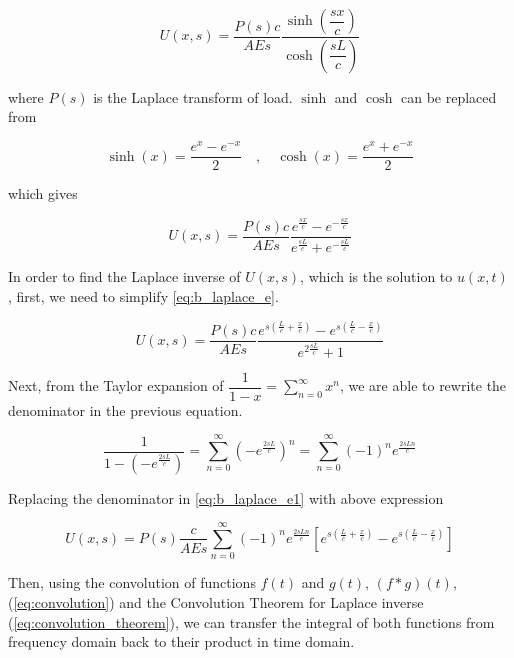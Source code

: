 \documentclass{article}
\begin{document}
\begin{equation}
    U(x, s) = \frac{P(s) c}{AE s} \frac{\sinh(\dfrac{sx}{c})}{\cosh(\dfrac{sL}{c})}
    \label{eq:b_laplace_sch}
\end{equation}

where $P(s)$ is the Laplace transform of load. $\sinh$ and $\cosh$ can be replaced from

\begin{equation*}
    \sinh(x) = \dfrac{e^x - e^{-x}}{2} \quad , \quad \cosh(x) = \dfrac{e^x + e^{-x}}{2}
\end{equation*}

which gives 

\begin{equation}
    U(x, s) = \frac{P(s) c}{AE s} \frac{e^{\frac{sx}{c}} - e^{-\frac{sx}{c}}}{e^{\frac{sL}{c}} + e^{-\frac{sL}{c}}}
    \label{eq:b_laplace_e}
\end{equation}

In order to find the Laplace inverse of $U(x, s)$, which is the solution to $u(x, t)$, first, we need to simplify \cref{eq:b_laplace_e}.

\begin{equation}
    U(x, s) = \frac{P(s) c}{AE s} \frac{e^{s(\frac{L}{c} + \frac{x}{c})} - e^{s(\frac{L}{c}-\frac{x}{c})}}{e^{2\frac{sL}{c}} + 1}
    \label{eq:b_laplace_e1}
\end{equation}

Next, from the Taylor expansion of $\dfrac{1}{1 - x} = \displaystyle\sum_{n = 0}^{\infty} x^n$, we are able to rewrite the denominator in the previous equation.

\begin{equation*}
    \frac{1}{1 - (-e^{\frac{2sL}{c}})} = \sum_{n = 0}^{\infty} (-e^{\frac{2sL}{c}})^n = \sum_{n = 0}^{\infty} (-1)^n e^{\frac{2sLn}{c}}
\end{equation*}

Replacing the denominator in \cref{eq:b_laplace_e1} with above expression

\begin{equation}
    U(x, s) = P(s) \frac{c}{AE s} \sum_{n = 0}^{\infty} (-1)^n e^{\frac{2sLn}{c}} \left [ e^{s(\frac{L}{c} + \frac{x}{c})} - e^{s(\frac{L}{c} - \frac{x}{c})} \right]
    \label{eq:b_laplace_e2}
\end{equation}

Then, using the convolution of functions $f(t)$ and $g(t)$, $(f*g)(t)$, (\cref{eq:convolution}) and the Convolution Theorem for Laplace inverse (\cref{eq:convolution_theorem}), we can transfer the integral of both functions from frequency domain back to their product in time domain. 
\end{document}
